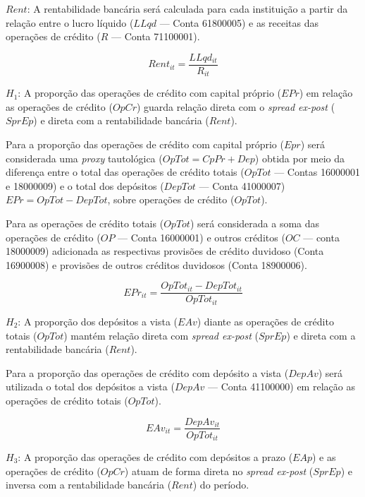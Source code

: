\documentclass[
  12pt,
  12pt,
  openright,
  oneside,
  a4paper,
  chapter=TITLE,
  section=TITLE,
  subsection=TITLE,
  subsubsection=TITLE,
  english,
  portugues,
  sumario=tradicional]{abntex2}
\begin{document}
\(Rent\): A rentabilidade bancária será calculada para cada instituição a partir da relação entre o lucro líquido (\(LLqd\) --- Conta 61800005) e as receitas das operações de crédito (\(R\) --- Conta 71100001).

\begin{equation}
Rent_{it} = \frac{LLqd_{it}}{R_{it}}
\end{equation}

\(H_{1}\): A proporção das operações de crédito com capital próprio (\(EPr\)) em relação as operações de crédito (\(OpCr\)) guarda relação direta com o \emph{spread ex-post} (\(SprEp\)) e direta com a rentabilidade bancária (\(Rent\)).

Para a proporção das operações de crédito com capital próprio (\(Epr\)) será considerada uma \emph{proxy} tautológica (\(OpTot = CpPr + Dep\)) obtida por meio da diferença entre o total das operações de crédito totais (\(OpTot\) --- Contas 16000001 e 18000009) e o total dos depósitos (\(DepTot\) --- Conta 41000007) \(EPr = OpTot - DepTot\), sobre operações de crédito (\(OpTot\)).

Para as operações de crédito totais (\(OpTot\)) será considerada a soma das operações de crédito (\(OP\) --- Conta 16000001) e outros créditos (\(OC\) --- conta 18000009) adicionada as respectivas provisões de crédito duvidoso (Conta 16900008) e provisões de outros créditos duvidosos (Conta 18900006).

\begin{equation}
EPr_{it} = \frac{OpTot_{it} - DepTot_{it}}{OpTot_{it}}
\end{equation}

\(H_{2}\): A proporção dos depósitos a vista (\(EAv\)) diante as operações de crédito totais (\(OpTot\)) mantém relação direta com \emph{spread ex-post} (\(SprEp\)) e direta com a rentabilidade bancária (\(Rent\)).

Para a proporção das operações de crédito com depósito a vista (\(DepAv\)) será utilizada o total dos depósitos a vista (\(DepAv\) --- Conta 41100000) em relação as operações de crédito totais (\(OpTot\)).

\begin{equation}
EAv_{it} = \frac{DepAv_{it}}{OpTot_{it}}
\end{equation}

\(H_{3}\): A proporção das operações de crédito com depósitos a prazo (\(EAp\)) e as operações de crédito (\(OpCr\)) atuam de forma direta no \emph{spread ex-post} (\(SprEp\)) e inversa com a rentabilidade bancária (\(Rent\)) do período.
\end{document}
